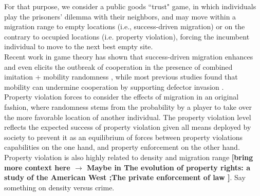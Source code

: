 For that purpose, we consider a public goods ``trust" game,\cite{} in which individuals play the prisoners' dilemma with their neighbors, and may move within a migration range to empty locations (i.e., success-driven migration) or on the contrary to occupied locations (i.e. property violation), forcing the incumbent individual to move to the next best empty site.\\

Recent work in game theory has shown that success-driven migration enhances and even elicits the outbreak of cooperation in the presence of combined imitation + mobility randomness \cite{helbing2009outbreak}, while most previous studies found that mobility can undermine cooperation by supporting defector invasion \cite{}. \\ %

Property violation forces to consider the effects of migration in an original fashion, where randomness stems from the probability by a player to take over the more favorable location of another individual. The property violation level reflects the expected success of property violation given all means deployed by society to prevent it as an equilibrium of forces between property violations capabilities on the one hand, and property enforcement on the other hand.\\

Property violation is also highly related to density and migration range {\bf [bring  more context here $\rightarrow$ Maybe in The evolution of property rights: a study of the American West \cite{anderson1975evolution};The private enforcement of law \cite{landes1974private}]}. Say something on density versus crime.\\


